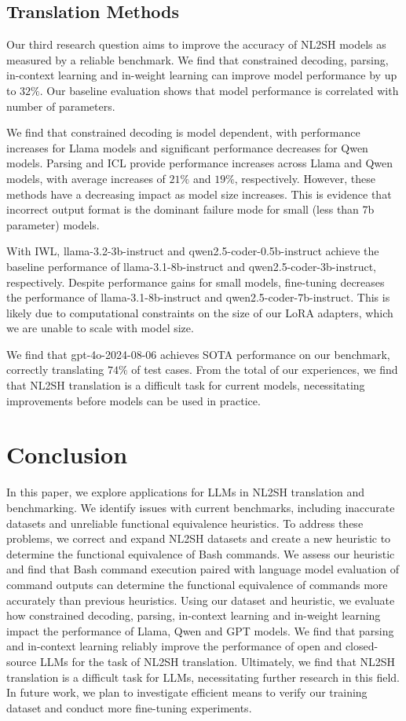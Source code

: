 \documentclass[11pt]{article}
\begin{document}
\subsection{Translation Methods}
Our third research question aims to improve the accuracy of NL2SH models as measured by a reliable benchmark. We find that constrained decoding, parsing, in-context learning and in-weight learning can improve model performance by up to $32\%$. Our baseline evaluation shows that model performance is correlated with number of parameters.

We find that constrained decoding is model dependent, with performance increases for Llama models and significant performance decreases for Qwen models. Parsing and ICL provide performance increases across Llama and Qwen models, with average increases of $21\%$ and $19\%$, respectively. However, these methods have a decreasing impact as model size increases. This is evidence that incorrect output format is the dominant failure mode for small (less than 7b parameter) models.

With IWL, llama-3.2-3b-instruct and qwen2.5-coder-0.5b-instruct achieve the baseline performance of llama-3.1-8b-instruct and qwen2.5-coder-3b-instruct, respectively. Despite performance gains for small models, fine-tuning decreases the performance of llama-3.1-8b-instruct and qwen2.5-coder-7b-instruct. This is likely due to computational constraints on the size of our LoRA adapters, which we are unable to scale with model size.

We find that gpt-4o-2024-08-06 achieves SOTA performance on our benchmark, correctly translating $74\%$ of test cases. From the total of our experiences, we find that NL2SH translation is a difficult task for current models, necessitating improvements before models can be used in practice.


\section{Conclusion}
\label{sec:conclusion}
In this paper, we explore applications for LLMs in NL2SH translation and benchmarking. We identify issues with current benchmarks, including inaccurate datasets and unreliable functional equivalence heuristics. To address these problems, we correct and expand NL2SH datasets and create a new heuristic to determine the functional equivalence of Bash commands. We assess our heuristic and find that Bash command execution paired with language model evaluation of command outputs can determine the functional equivalence of commands more accurately than previous heuristics. Using our dataset and heuristic, we evaluate how constrained decoding, parsing, in-context learning and in-weight learning impact the performance of Llama, Qwen and GPT models. We find that parsing and in-context learning reliably improve the performance of open and closed-source LLMs for the task of NL2SH translation. Ultimately, we find that NL2SH translation is a difficult task for LLMs, necessitating further research in this field. In future work, we plan to investigate efficient means to verify our training dataset and conduct more fine-tuning experiments.
\end{document}
